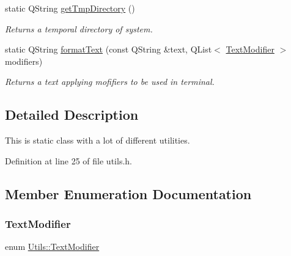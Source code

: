\begin{DoxyCompactItemize}
static Q\+String \mbox{\hyperlink{classUtils_a85a0cb065fa4399c42ce834952420d7a}{get\+Tmp\+Directory}} ()
\begin{DoxyCompactList}\small\item\em Returns a temporal directory of system. \end{DoxyCompactList}\item 
static Q\+String \mbox{\hyperlink{classUtils_a9885ad8eac3df9b5e22363dd1e9ff5b2}{format\+Text}} (const Q\+String \&text, Q\+List$<$ \mbox{\hyperlink{classUtils_a32d52b4a749614335d60c2c3969b8df2}{Text\+Modifier}} $>$ modifiers)
\begin{DoxyCompactList}\small\item\em Returns a text applying mofifiers to be used in terminal. \end{DoxyCompactList}\end{DoxyCompactItemize}


\subsection{Detailed Description}
This is static class with a lot of different utilities. 

Definition at line 25 of file utils.\+h.



\subsection{Member Enumeration Documentation}
\mbox{\label{classUtils_a32d52b4a749614335d60c2c3969b8df2}} 
\subsubsection{\texorpdfstring{Text\+Modifier}{TextModifier}}
{\footnotesize\ttfamily enum \mbox{\hyperlink{classUtils_a32d52b4a749614335d60c2c3969b8df2}{Utils\+::\+Text\+Modifier}}}

